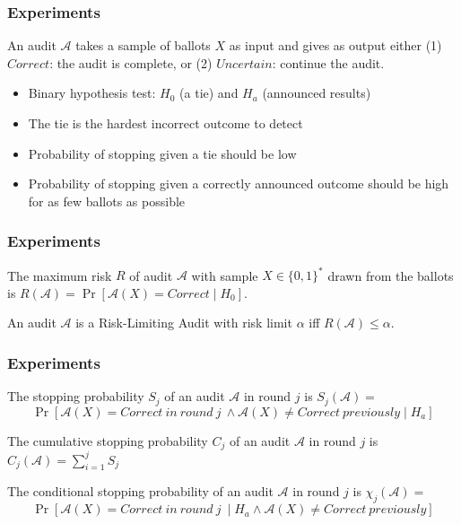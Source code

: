 \documentclass{beamer}
\begin{document}
\begin{frame}
\frametitle{Experiments}
\begin{definition}
An audit $\mathcal{A}$ takes a sample of ballots $X$ as input and gives as output either
(1) $Correct$: the audit is complete, or (2) $Uncertain$: continue the audit.
\end{definition}

\pause 
\begin{itemize}
\item Binary hypothesis test: $H_0$ (a tie) and $H_a$ (announced results)
\pause 
\item The tie is the hardest incorrect outcome to detect 
\pause 
\item Probability of stopping given a tie should be low
\pause 
\item Probability of stopping given a correctly announced outcome should be high for as few ballots as possible 
\end{itemize}
\end{frame}

\begin{frame}
\frametitle{Experiments}
\begin{definition}
The maximum risk $R$ of audit $\mathcal{A}$ with sample $X\in \{0,1\}^*$ drawn from 
the ballots is
$R(\mathcal{A})=\Pr[\mathcal{A}(X)=Correct \mid H_0].$
\end{definition}

\pause 
\begin{definition}
An audit $\mathcal{A}$ is a Risk-Limiting Audit with 
risk limit $\alpha$ iff 
$R(\mathcal{A}) \le \alpha.$
\end{definition}
\end{frame}

\begin{frame}
\frametitle{Experiments}
\begin{definition}
The stopping probability $S_j$ of an audit $\mathcal{A}$ in round $j$ is 
$S_j(\mathcal{A})=$
$$\Pr[\mathcal{A}(X)=Correct ~in~round~j~\land \mathcal{A}(X) \neq Correct ~previously \mid H_a]$$
\end{definition}

\pause 
\begin{definition}
The cumulative stopping probability $C_j$ of an audit $\mathcal{A}$ in round $j$ is $C_j(\mathcal{A})= \sum_{i=1}^j S_j$
\end{definition}

\pause 
\begin{definition}
The conditional stopping probability  of an audit $\mathcal{A}$ in round $j$ is 
$\chi_j (\mathcal{A})=$
$$\Pr[\mathcal{A}(X)=Correct ~in~round~j~\mid H_a \land \mathcal{A}(X) \neq Correct ~previously]$$
\end{definition}
\end{frame}
\end{document}
